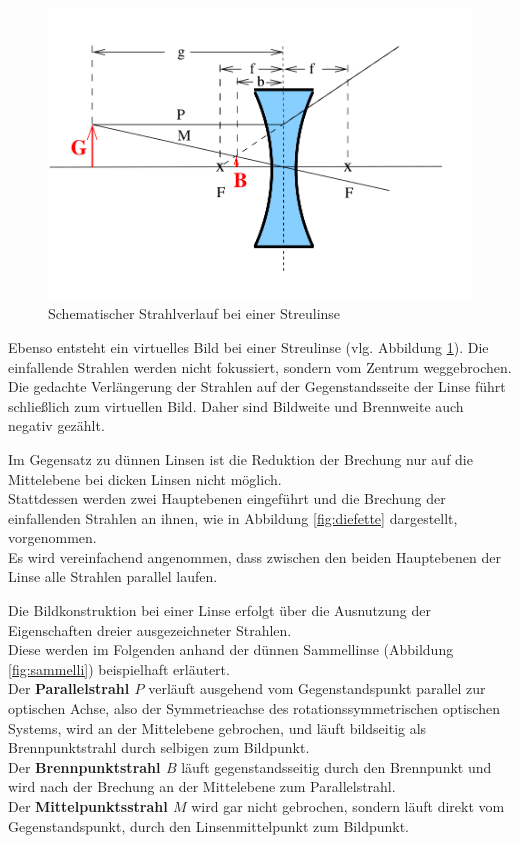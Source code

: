 \begin{figure}
  \includegraphics[width=\linewidth]{Bilder/streulinse.png}
  \caption{Schematischer Strahlverlauf bei einer Streulinse \cite{Anleitung}}
  \label{fig:streuli}
\end{figure}
Ebenso entsteht ein virtuelles Bild bei einer Streulinse (vlg. Abbildung \ref{fig:streuli}).
Die einfallende Strahlen werden nicht fokussiert, sondern vom Zentrum weggebrochen. Die gedachte Verlängerung der Strahlen auf der Gegenstandsseite der Linse führt schließlich zum virtuellen Bild. Daher sind Bildweite und Brennweite auch negativ gezählt.

Im Gegensatz zu dünnen Linsen ist die Reduktion der Brechung nur auf die Mittelebene bei dicken Linsen nicht möglich. \\
Stattdessen werden zwei Hauptebenen eingeführt und die Brechung der einfallenden Strahlen an ihnen, wie in Abbildung \ref{fig:diefette} dargestellt, vorgenommen.
\\Es wird vereinfachend angenommen, dass zwischen den beiden Hauptebenen der Linse alle Strahlen parallel laufen.

Die Bildkonstruktion bei einer Linse erfolgt über die Ausnutzung der Eigenschaften dreier ausgezeichneter Strahlen. \\
Diese werden im Folgenden anhand der dünnen Sammellinse (Abbildung \ref{fig:sammelli}) beispielhaft erläutert.\\
Der \textbf{Parallelstrahl $P$} verläuft ausgehend vom Gegenstandspunkt parallel zur optischen Achse, also der Symmetrieachse des rotationssymmetrischen optischen Systems, wird an der Mittelebene gebrochen, und läuft bildseitig als Brennpunktstrahl durch selbigen zum Bildpunkt.
\\Der \textbf{Brennpunktstrahl $B$} läuft gegenstandsseitig durch den Brennpunkt und wird nach der Brechung an der Mittelebene zum Parallelstrahl.
\\Der \textbf{Mittelpunktsstrahl $M$} wird gar nicht gebrochen, sondern läuft direkt vom Gegenstandspunkt, durch den Linsenmittelpunkt zum Bildpunkt.

